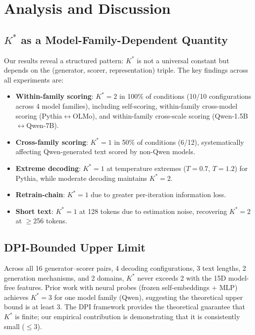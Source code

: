 \documentclass[11pt,a4paper]{article}
\newcommand{\kstar}{K^{*}}
\begin{document}
\section{Analysis and Discussion}
\label{sec:discussion}

\subsection{$\kstar$ as a Model-Family-Dependent Quantity}

Our results reveal a structured pattern: $\kstar$ is not a universal constant but depends on the (generator, scorer, representation) triple.
The key findings across all experiments are:

\begin{itemize}
    \item \textbf{Within-family scoring}: $\kstar = 2$ in 100\% of conditions (10/10 configurations across 4 model families), including self-scoring, within-family cross-model scoring (Pythia$\leftrightarrow$OLMo), and within-family cross-scale scoring (Qwen-1.5B$\leftrightarrow$Qwen-7B).
    \item \textbf{Cross-family scoring}: $\kstar = 1$ in 50\% of conditions (6/12), systematically affecting Qwen-generated text scored by non-Qwen models.
    \item \textbf{Extreme decoding}: $\kstar = 1$ at temperature extremes ($T = 0.7$, $T = 1.2$) for Pythia, while moderate decoding maintains $\kstar = 2$.
    \item \textbf{Retrain-chain}: $\kstar = 1$ due to greater per-iteration information loss.
    \item \textbf{Short text}: $\kstar = 1$ at 128 tokens due to estimation noise, recovering $\kstar = 2$ at $\geq$256 tokens.
\end{itemize}

\subsection{DPI-Bounded Upper Limit}

Across all 16 generator--scorer pairs, 4 decoding configurations, 3 text lengths, 2 generation mechanisms, and 2 domains, $\kstar$ never exceeds 2 with the 15D model-free features.
Prior work with neural probes (frozen self-embeddings + MLP) achieves $\kstar = 3$ for one model family (Qwen), suggesting the theoretical upper bound is at least 3.
The DPI framework provides the theoretical guarantee that $\kstar$ is finite; our empirical contribution is demonstrating that it is consistently small ($\leq 3$).
\end{document}
